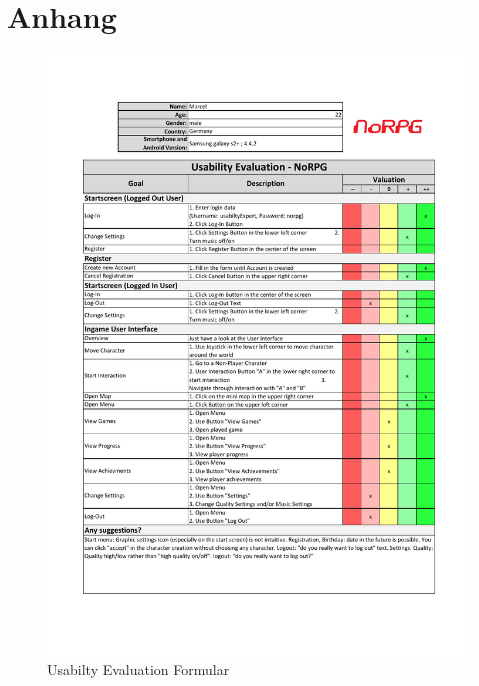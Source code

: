 \chapter*{Anhang}
\begin{figure}[htbp]
	\centering 
	\label{ueMarcel}
	\includegraphics[width=\textwidth]{pics/UE-Marcel.pdf}
	\caption{Usabilty Evaluation Formular}
\end{figure}